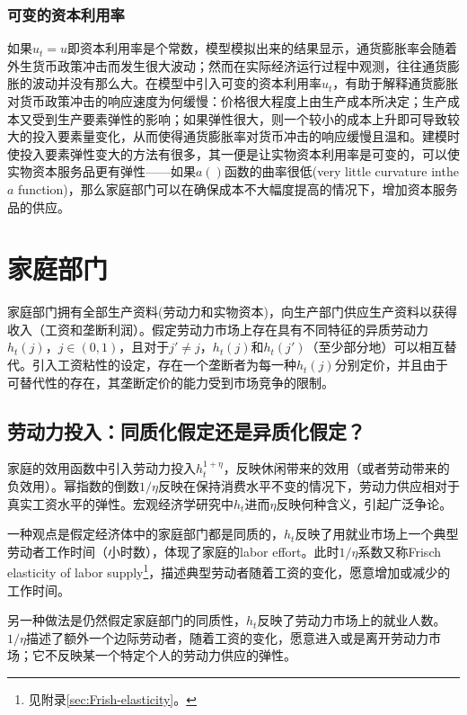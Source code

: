 \subsubsection{可变的资本利用率}
\label{sec:variable-capital-utili}
如果$u_t=u$即资本利用率是个常数，模型模拟出来的结果显示，通货膨胀率会随着外生货币政策冲击而发生很大波动；然而在实际经济运行过程中观测，往往通货膨胀的波动并没有那么大。在模型中引入可变的资本利用率$u_t$，有助于解释通货膨胀对货币政策冲击的响应速度为何缓慢：价格很大程度上由生产成本所决定；生产成本又受到生产要素弹性的影响；如果弹性很大，则一个较小的成本上升即可导致较大的投入要素量变化，从而使得通货膨胀率对货币冲击的响应缓慢且温和。建模时使投入要素弹性变大的方法有很多，其一便是让实物资本利用率是可变的，可以使实物资本服务品更有弹性——如果$a()$函数的曲率很低(very little curvature inthe $a$ function)，那么家庭部门可以在确保成本不大幅度提高的情况下，增加资本服务品的供应。

\section{家庭部门}
\label{sec:household-sector}
家庭部门拥有全部生产资料(劳动力和实物资本)，向生产部门供应生产资料以获得收入（工资和垄断利润）。假定劳动力市场上存在具有不同特征的异质劳动力$h_t(j)$，$j \in (0,1)$，且对于$j' \neq j$，$h_t(j)$和$h_t(j')$（至少部分地）可以相互替代。引入工资粘性的设定\citep{Erceg:2000dm}，存在一个垄断者为每一种$h_t(j)$分别定价，并且由于可替代性的存在，其垄断定价的能力受到市场竞争的限制\citep{Christiano:2010wla}。

\subsection{劳动力投入：同质化假定还是异质化假定？}
\label{sec:interpretation-H}
家庭的效用函数中引入劳动力投入$h_t^{1+\eta}$，反映休闲带来的效用（或者劳动带来的负效用）。幂指数的倒数$1/\eta$反映在保持消费水平不变的情况下，劳动力供应相对于真实工资水平的弹性。宏观经济学研究中$h_t$进而$\eta$反映何种含义，引起广泛争论。

一种观点是假定经济体中的家庭部门都是同质的，$h_t$反映了用就业市场上一个典型劳动者工作时间（小时数），体现了家庭的labor effort。此时$1/\eta$系数又称Frisch elasticity of labor supply\footnote{见附录\ref{sec:Frish-elasticity}。}，描述典型劳动者随着工资的变化，愿意增加或减少的工作时间。

另一种做法是仍然假定家庭部门的同质性，$h_t$反映了劳动力市场上的就业人数。$1/\eta$描述了额外一个边际劳动者，随着工资的变化，愿意进入或是离开劳动力市场；它不反映某一个特定个人的劳动力供应的弹性。

